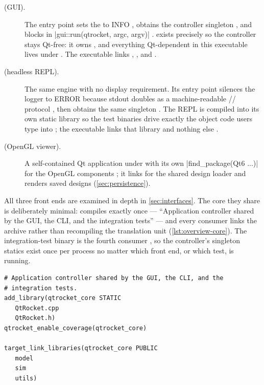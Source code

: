 \begin{description}
\item[ (GUI).] The entry point sets the  to INFO
  , obtains the controller singleton , and blocks in
  \cppinline|gui::run(qtrocket, argc, argv)| .  exists
  precisely so the controller stays Qt-free: it owns , and everything
  Qt-dependent in this executable lives under  . The executable links
  , , and 
  .
\item[ (headless REPL).] The same engine with no display requirement.
  Its entry point silences the logger to ERROR because stdout doubles as a
  machine-readable // protocol ,
  then obtains the same singleton . The REPL is compiled into its
  own  static library so the test binaries drive exactly the object code users
  type into ; the executable links that library and nothing else
  .
\item[ (OpenGL viewer).] A self-contained Qt application under
   with its own \cppinline|find_package(Qt6 ...)| for the OpenGL
  components ; it links  for the
  shared design loader  and renders saved  designs
  (\cref{sec:persistence}).
\end{description}

All three front ends are examined in depth in \cref{sec:interfaces}. The core they share
is deliberately minimal:  compiles  exactly once
--- ``Application controller shared by the GUI, the CLI, and the integration tests''
 --- and every consumer links the archive rather than recompiling
the translation unit (\cref{lst:overview-core}). The integration-test binary is the fourth
consumer , so the controller's singleton statics exist once
per process no matter which front end, or which test, is running.

\begin{listing}[htbp]
\begin{verbatim}
# Application controller shared by the GUI, the CLI, and the
# integration tests.
add_library(qtrocket_core STATIC
   QtRocket.cpp
   QtRocket.h)
qtrocket_enable_coverage(qtrocket_core)

target_link_libraries(qtrocket_core PUBLIC
   model
   sim
   utils)
\end{verbatim}
\caption{The keystone of the link graph . The controller
compiles once into a static library; the three executables and the integration tests all
link it, and its  dependencies hand every consumer the layer libraries
below.}\label{lst:overview-core}
\end{listing}

